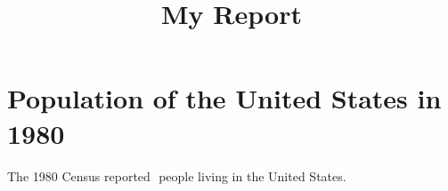 \documentclass{article}
\title{My Report}
\begin{document}
\maketitle

\section{Population of the United States in 1980}
The 1980 Census reported $$ people living in the United States.
\end{document}
